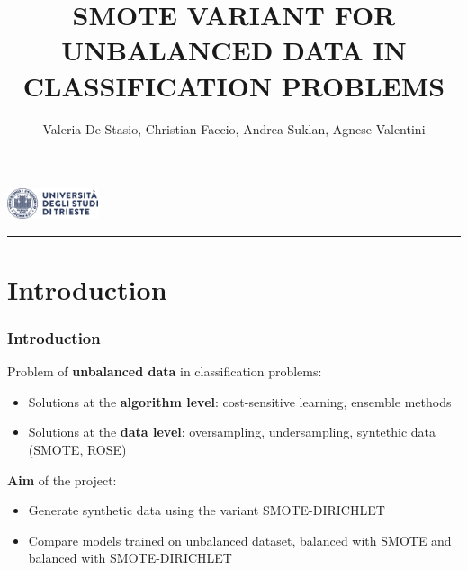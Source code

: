 \documentclass{beamer}
\title[SMOTE-DIRICHLET]{\LARGE SMOTE VARIANT FOR UNBALANCED DATA IN CLASSIFICATION PROBLEMS}
\author[De Stasio, Faccio, Suklan, Valentini]{\small Valeria De Stasio, Christian Faccio, Andrea Suklan, Agnese Valentini}
\begin{document}
\begin{frame}
  \centering
  \includegraphics[width=0.2\textwidth]{figures/logo.png} \\
  \rule{0.5\linewidth}{0.3pt}
  \titlepage
\end{frame}


\section{Introduction}

\begin{frame}
  \frametitle{Introduction}
  Problem of \textbf{unbalanced data} in classification problems:
  \begin{itemize}
    \item Solutions at the \textbf{algorithm level}: cost-sensitive learning, ensemble methods
    \item Solutions at the \textbf{data level}: oversampling, undersampling, syntethic data (SMOTE, ROSE)
  \end{itemize}
\end{frame}

\begin{frame}
  \textbf{Aim} of the project:
  \begin{itemize}
    \item Generate synthetic data using the variant SMOTE-DIRICHLET
    \item Compare models trained on unbalanced dataset, balanced with SMOTE and balanced with SMOTE-DIRICHLET
  \end{itemize}
\end{frame}
\end{document}
